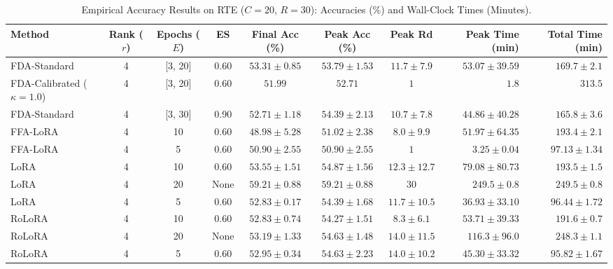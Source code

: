 \documentclass[10pt,a4paper]{article}
\begin{document}
\begin{table}[H]
\centering
\caption{Empirical Accuracy Results on RTE ($C=20$, $R=30$): Accuracies (\%) and Wall-Clock Times (Minutes).}
\scriptsize
\setlength{\tabcolsep}{3.5pt}
\begin{tabular*}{\textwidth}{@{\extracolsep{\fill}}lccccccrr@{}}
\toprule
\textbf{Method} & \textbf{Rank ($r$)} & \textbf{Epochs ($E$)} & \textbf{ES} & \textbf{Final Acc (\%)} & \textbf{Peak Acc (\%)} & \textbf{Peak Rd} & \textbf{Peak Time (min)} & \textbf{Total Time (min)} \\
\midrule
FDA-Standard & 4 & [3, 20] & 0.60 & $53.31 \pm 0.85$ & $53.79 \pm 1.53$ & $11.7 \pm 7.9$ & $53.07 \pm 39.59$ & $169.7 \pm 2.1$ \\
FDA-Calibrated ($\kappa=1.0$) & 4 & [3, 20] & 0.60 & $51.99$ & $52.71$ & $1$ & $\mathbf{1.8}$ & $313.5$ \\
FDA-Standard & 4 & [3, 30] & 0.90 & $52.71 \pm 1.18$ & $54.39 \pm 2.13$ & $10.7 \pm 7.8$ & $44.86 \pm 40.28$ & $165.8 \pm 3.6$ \\
FFA-LoRA & 4 & 10 & 0.60 & $48.98 \pm 5.28$ & $51.02 \pm 2.38$ & $8.0 \pm 9.9$ & $51.97 \pm 64.35$ & $193.4 \pm 2.1$ \\
FFA-LoRA & 4 & 5 & 0.60 & $50.90 \pm 2.55$ & $50.90 \pm 2.55$ & $1$ & $3.25 \pm 0.04$ & $97.13 \pm 1.34$ \\
LoRA & 4 & 10 & 0.60 & $53.55 \pm 1.51$ & $54.87 \pm 1.56$ & $12.3 \pm 12.7$ & $79.08 \pm 80.73$ & $193.5 \pm 1.5$ \\
LoRA & 4 & 20 & None & $\mathbf{59.21 \pm 0.88}$ & $\mathbf{59.21 \pm 0.88}$ & $30$ & $249.5 \pm 0.8$ & $249.5 \pm 0.8$ \\
LoRA & 4 & 5 & 0.60 & $52.83 \pm 0.17$ & $54.39 \pm 1.68$ & $11.7 \pm 10.5$ & $36.93 \pm 33.10$ & $96.44 \pm 1.72$ \\
RoLoRA & 4 & 10 & 0.60 & $52.83 \pm 0.74$ & $54.27 \pm 1.51$ & $8.3 \pm 6.1$ & $53.71 \pm 39.33$ & $191.6 \pm 0.7$ \\
RoLoRA & 4 & 20 & None & $53.19 \pm 1.33$ & $54.63 \pm 1.48$ & $14.0 \pm 11.5$ & $116.3 \pm 96.0$ & $248.3 \pm 1.1$ \\
RoLoRA & 4 & 5 & 0.60 & $52.95 \pm 0.34$ & $54.63 \pm 2.23$ & $14.0 \pm 10.2$ & $45.30 \pm 33.32$ & $95.82 \pm 1.67$ \\
\bottomrule
\end{tabular*}
\end{table}
\end{document}
